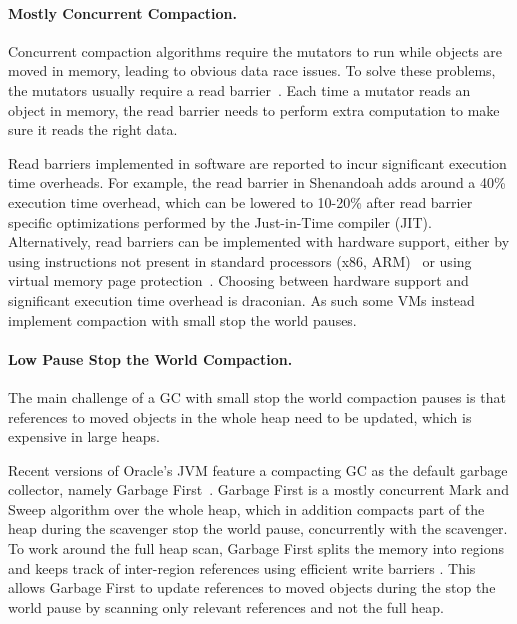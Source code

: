 \documentclass[sigplan,10pt,screen]{acmart}\settopmatter{printfolios=true,printccs=true,printacmref=true}
\begin{document}
\paragraph{Mostly Concurrent Compaction.} Concurrent compaction algorithms require the mutators to run while objects are moved in memory, leading to obvious data race issues. To solve these problems, the mutators usually require a read barrier~\cite{AzulVirtualMemConcCompact,IBMConcCompact,AzulHardwareReadBarrierConcCompact,Shenandoah,MetronomeIBMGC,RTConcCompactGC,RTGCBrooksReadBarrier}.
Each time a mutator reads an object in memory, the read barrier needs to perform extra computation to make sure it reads the right data. 

Read barriers implemented in software are reported to incur significant execution time overheads. For example, the read barrier in Shenandoah \cite{Shenandoah} adds around a 40\% execution time overhead, which can be lowered to 10-20\% after read barrier specific optimizations performed by the Just-in-Time compiler (JIT). Alternatively, read barriers can be implemented with hardware support, either by using instructions not present in standard processors (x86, ARM)~\cite{IBMConcCompact,AzulHardwareReadBarrierConcCompact,AzulSTMConcCompact} or using virtual memory page protection~\cite{AzulVirtualMemConcCompact,CompressorVirtualMemConcCompact}. 
Choosing between hardware support and significant execution time overhead is draconian. As such some VMs instead implement compaction with small stop the world pauses.

\paragraph{Low Pause Stop the World Compaction.}
The main challenge of a GC with small stop the world compaction pauses is that 
references to moved objects in the whole heap need to be updated, which is expensive in large heaps. 

Recent versions of Oracle's JVM feature a compacting GC as the default garbage collector, namely Garbage First~\cite{G1}. Garbage First is a mostly concurrent Mark and Sweep algorithm over the whole heap, which in addition compacts part of the heap during the scavenger stop the world pause, concurrently with the scavenger. To work around the full heap scan, Garbage First splits the memory into regions and keeps track of inter-region references using efficient write barriers \cite{BarriersFriendFoe}. This allows Garbage First to update references to moved objects during the stop the world pause by scanning only relevant references and not the full heap.
\end{document}
